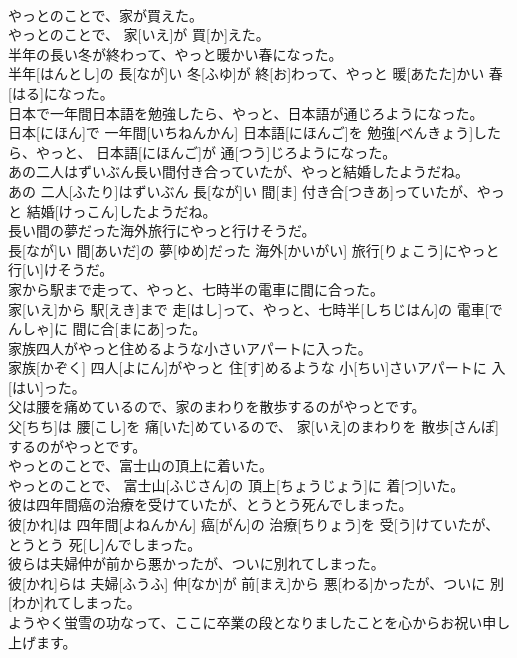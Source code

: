 \documentclass[8pt]{extreport}
\begin{document}
\begin{CJK}{UTF8}{min}
\\	やっとのことで、家が買えた。	
\\	やっとのことで、 家[いえ]が 買[か]えた。
\\	半年の長い冬が終わって、やっと暖かい春になった。	
\\	半年[はんとし]の 長[なが]い 冬[ふゆ]が 終[お]わって、やっと 暖[あたた]かい 春[はる]になった。
\\	日本で一年間日本語を勉強したら、やっと、日本語が通じろようになった。	
\\	日本[にほん]で 一年間[いちねんかん] 日本語[にほんご]を 勉強[べんきょう]したら、やっと、 日本語[にほんご]が 通[つう]じろようになった。
\\	あの二人はずいぶん長い間付き合っていたが、やっと結婚したようだね。	
\\	あの 二人[ふたり]はずいぶん 長[なが]い 間[ま] 付き合[つきあ]っていたが、やっと 結婚[けっこん]したようだね。
\\	長い間の夢だった海外旅行にやっと行けそうだ。	
\\	長[なが]い 間[あいだ]の 夢[ゆめ]だった 海外[かいがい] 旅行[りょこう]にやっと 行[い]けそうだ。
\\	家から駅まで走って、やっと、七時半の電車に間に合った。	
\\	家[いえ]から 駅[えき]まで 走[はし]って、やっと、七時半[しちじはん]の 電車[でんしゃ]に 間に合[まにあ]った。
\\	家族四人がやっと住めるような小さいアパートに入った。	
\\	家族[かぞく] 四人[よにん]がやっと 住[す]めるような 小[ちい]さいアパートに 入[はい]った。
\\	父は腰を痛めているので、家のまわりを散歩するのがやっとです。	
\\	父[ちち]は 腰[こし]を 痛[いた]めているので、 家[いえ]のまわりを 散歩[さんぽ]するのがやっとです。
\\	やっとのことで、富士山の頂上に着いた。	
\\	やっとのことで、 富士山[ふじさん]の 頂上[ちょうじょう]に 着[つ]いた。
\\	彼は四年間癌の治療を受けていたが、とうとう死んでしまった。	
\\	彼[かれ]は 四年間[よねんかん] 癌[がん]の 治療[ちりょう]を 受[う]けていたが、とうとう 死[し]んでしまった。
\\	彼らは夫婦仲が前から悪かったが、ついに別れてしまった。	
\\	彼[かれ]らは 夫婦[ふうふ] 仲[なか]が 前[まえ]から 悪[わる]かったが、ついに 別[わか]れてしまった。
\\	ようやく蛍雪の功なって、ここに卒業の段となりましたことを心からお祝い申し上げます。	

\end{CJK}
\end{document}
